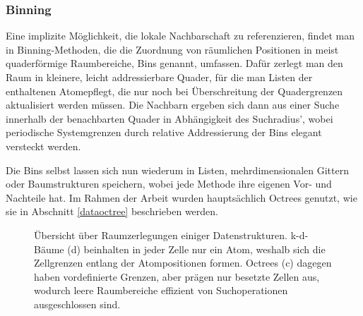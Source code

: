 \subsubsection{Binning}

Eine implizite Möglichkeit, die lokale Nachbarschaft zu referenzieren, findet man in Binning-Methoden, die die Zuordnung von räumlichen Positionen in meist quaderförmige Raumbereiche, Bins genannt, umfassen.
Dafür zerlegt man den Raum in kleinere, leicht addressierbare Quader, für die man Listen der enthaltenen Atomepflegt, die nur noch bei Überschreitung der Quadergrenzen aktualisiert werden müssen.
Die Nachbarn ergeben sich dann aus einer Suche innerhalb der benachbarten Quader in Abhängigkeit des Suchradius', wobei periodische Systemgrenzen durch relative Addressierung der Bins elegant versteckt werden.

Die Bins selbst lassen sich nun wiederum in Listen, mehrdimensionalen Gittern oder Baumstrukturen speichern, wobei jede Methode ihre eigenen Vor- und Nachteile hat.
Im Rahmen der Arbeit wurden hauptsächlich Octrees genutzt, wie sie in Abschnitt \ref{dataoctree} beschrieben werden.

\begin{figure}[bhpt]
  \caption[Übersicht über räumliche Datenstrukturen]{
    Übersicht über Raumzerlegungen einiger Datenstrukturen.
    k-d-Bäume (d) beinhalten in jeder Zelle nur ein Atom, weshalb sich die Zellgrenzen entlang der Atompositionen formen.
    Octrees (c) dagegen haben vordefinierte Grenzen, aber prägen nur besetzte Zellen aus, wodurch leere Raumbereiche effizient von Suchoperationen ausgeschlossen sind.
}
  \label{fig:datastructures}
\end{figure}

